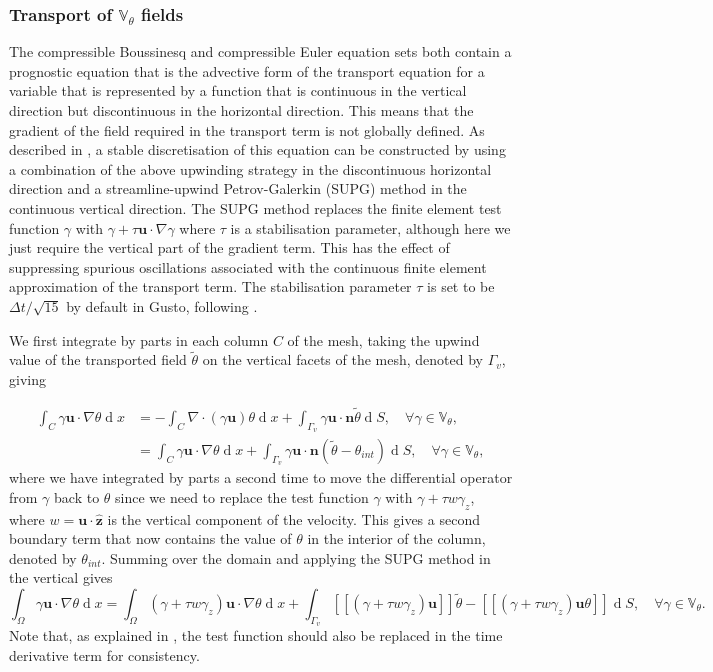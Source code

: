 \documentclass[journal abbreviation, manuscript]{copernicus}
\def\MM#1{\boldsymbol{#1}}
\DeclareMathOperator{\diff}{d}
\newcommand{\jump}[1]{[\![#1]\!]}
\begin{document}
\subsubsection{Transport of $\mathbb{V}_\theta$ fields}
\label{subsec: theta transport}
The compressible Boussinesq and compressible Euler equation sets both
contain a prognostic equation that is the advective form of the
transport equation for a variable that is represented by a function
that is continuous in the vertical direction but discontinuous in the
horizontal direction. This means that the gradient of the field
required in the transport term is not globally defined. As described
in \citet{yamazaki2017vertical}, a stable discretisation of this
equation can be constructed by using a combination of the above
upwinding strategy in the discontinuous horizontal direction and a
streamline-upwind Petrov-Galerkin (SUPG) method
\citep{brooks1982streamline} in the continuous vertical direction. The
SUPG method replaces the finite element test function $\gamma$ with
$\gamma + \tau \MM{u}\cdot\nabla\gamma$ where $\tau$ is a
stabilisation parameter, although here we just require the vertical
part of the gradient term. This has the effect of suppressing spurious
oscillations associated with the continuous finite element
approximation of the transport term. The stabilisation parameter
$\tau$ is set to be $\Delta t/\sqrt{15}$ by default in Gusto,
following \citet{raymond1976selective}.

We first integrate by parts in each column $C$ of the mesh, taking the
upwind value of the transported field $\tilde{\theta}$ on the vertical
facets of the mesh, denoted by $\Gamma_v$, giving

\begin{align}
  \int_C \gamma\MM{u}\cdot\nabla\theta\diff x &= -\int_C \nabla\cdot(\gamma\MM{u})\theta \diff x + \int_{\Gamma_v}\gamma \MM{u}\cdot\MM{n}\tilde{\theta}\diff S, \quad \forall \gamma \in \mathbb{V}_\theta, \\
  &= \int_C \gamma\MM{u}\cdot\nabla\theta \diff x + \int_{\Gamma_v}\gamma \MM{u}\cdot\MM{n}(\tilde{\theta}-\theta_{int})\diff S, \quad \forall \gamma \in \mathbb{V}_\theta,
\end{align}
where we have integrated by parts a second time to move the
differential operator from $\gamma$ back to $\theta$ since we need to
replace the test function $\gamma$ with $\gamma+\tau w\gamma_z$, where
$w=\MM{u}\cdot\hat{\MM{z}}$ is the vertical component of the
velocity. This gives a second boundary term that now contains the
value of $\theta$ in the interior of the column, denoted by
$\theta_{int}$. Summing over the domain and applying the SUPG method
in the vertical gives
\begin{equation}
  \int_\Omega \gamma\MM{u}\cdot\nabla\theta\diff x =\int_\Omega(\gamma+\tau w\gamma_z)\MM{u}\cdot\nabla\theta \diff x + \int_{\Gamma_v}\jump{(\gamma+\tau w\gamma_z) \MM{u}}\tilde{\theta}-\jump{(\gamma+\tau w\gamma_z) \MM{u}\theta}\diff S, \quad \forall \gamma \in \mathbb{V}_\theta.
\end{equation}
Note that, as explained in \citet{cotter2023compatible}, the test
function should also be replaced in the time derivative term for
consistency.
\end{document}
